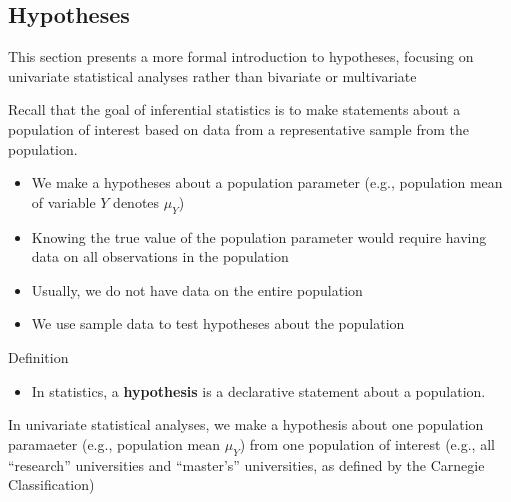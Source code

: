 \documentclass[
  letterpaper,
  DIV=11,
  numbers=noendperiod]{scrartcl}
\providecommand{\tightlist}{%
  \setlength{\itemsep}{0pt}\setlength{\parskip}{0pt}}\usepackage{longtable,booktabs,array}
\begin{document}
\subsection{Hypotheses}\label{hypotheses}

This section presents a more formal introduction to hypotheses, focusing
on univariate statistical analyses rather than bivariate or multivariate

Recall that the goal of inferential statistics is to make statements
about a population of interest based on data from a representative
sample from the population.

\begin{itemize}
\tightlist
\item
  We make a hypotheses about a population parameter (e.g., population
  mean of variable \(Y\) denotes \(\mu_Y\))
\item
  Knowing the true value of the population parameter would require
  having data on all observations in the population
\item
  Usually, we do not have data on the entire population
\item
  We use sample data to test hypotheses about the population
\end{itemize}

Definition

\begin{itemize}
\tightlist
\item
  In statistics, a \textbf{hypothesis} is a declarative statement about
  a population.
\end{itemize}

In univariate statistical analyses, we make a hypothesis about one
population paramaeter (e.g., population mean \(\mu_Y\)) from one
population of interest (e.g., all ``research'' universities and
``master's'' universities, as defined by the Carnegie Classification)
\end{document}
